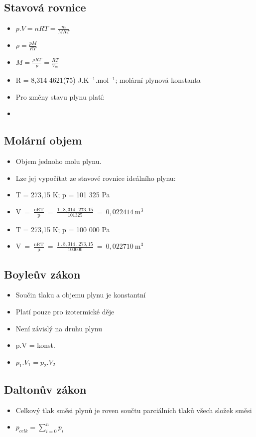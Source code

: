 \subsection{Stavová rovnice}
\begin{itemize}
	\item $p.V = nRT = \frac{m}{MRT}$
	\item $\rho = \frac{pM}{RT}$
	\item $M = \frac{\rho RT}{p} = \frac{RT}{V_m}$
	\item \small R = 8,314 4621(75) J.K$^{-1}$.mol$^{-1}$; molární plynová konstanta
	\item Pro změny stavu plynu platí:
	\item {}
\end{itemize}

\clearpage
\subsection{Molární objem}
\begin{itemize}
	\item Objem jednoho molu plynu.
	\item Lze jej vypočítat ze stavové rovnice ideálního plynu:
	\item T = 273,15 K; p = 101 325 Pa
	\item $\textrm{V}\ =\ \frac{\textrm{nRT}}{\textrm{p}}\ =\ \frac{1\ .\ 8,314\ .\ 273,15}{101 325}\ =\ 0,022414\ \textrm{m}^3$
	\item T = 273,15 K; p = 100 000 Pa
	\item $\textrm{V}\ =\ \frac{\textrm{nRT}}{\textrm{p}}\ =\ \frac{1\ .\ 8,314\ .\ 273,15}{100 000}\ =\ 0,022710\ \textrm{m}^3$
\end{itemize}

\subsection{Boyleův zákon}
\begin{itemize}
	\item Součin tlaku a objemu plynu je konstantní
	\item Platí pouze pro izotermické děje
	\item Není závislý na druhu plynu
	\item p.V = konst.
	\item $p_1.V_1 = p_2.V_2$
\end{itemize}

\subsection{Daltonův zákon}
\begin{itemize}
	\item Celkový tlak směsi plynů je roven součtu parciálních tlaků všech složek směsi
	\item $p_{celk} = \sum\limits_{i=0}^n p_i$
\end{itemize}

